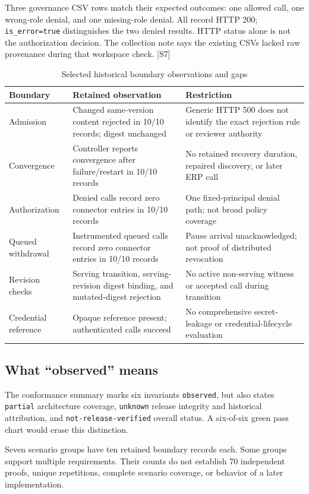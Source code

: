 Three governance CSV rows match their expected outcomes: one allowed call, one wrong-role denial, and one missing-role denial. All record HTTP 200; \texttt{is\_error=true} distinguishes the two denied results. HTTP status alone is not the authorization decision. The collection note says the existing CSVs lacked raw provenance during that workspace check. [S7]

\begin{table}[h]\caption{Selected historical boundary observations and gaps}\EvidenceTableStart
\begin{tabularx}{\linewidth}{@{}P{29mm}X X@{}}\toprule
Boundary & Retained observation & Restriction\\\midrule
Admission & Changed same-version content rejected in 10/10 records; digest unchanged & Generic HTTP 500 does not identify the exact rejection rule or reviewer authority\\
Convergence & Controller reports convergence after failure/restart in 10/10 records & No retained recovery duration, repaired discovery, or later ERP call\\
Authorization & Denied calls record zero connector entries in 10/10 records & One fixed-principal denial path; not broad policy coverage\\
Queued withdrawal & Instrumented queued calls record zero connector entries in 10/10 records & Pause arrival unacknowledged; not proof of distributed revocation\\
Revision checks & Serving transition, serving-revision digest binding, and mutated-digest rejection & No active non-serving witness or accepted call during transition\\
Credential reference & Opaque reference present; authenticated calls succeed & No comprehensive secret-leakage or credential-lifecycle evaluation\\\bottomrule
\end{tabularx}\end{table}

\subsection*{What ``observed'' means}
The conformance summary marks six invariants \texttt{observed}, but also states \texttt{partial} architecture coverage, \texttt{unknown} release integrity and historical attribution, and \texttt{not-release-verified} overall status. A six-of-six green pass chart would erase this distinction.

Seven scenario groups have ten retained boundary records each. Some groups support multiple requirements. Their counts do not establish 70 independent proofs, unique repetitions, complete scenario coverage, or behavior of a later implementation.

